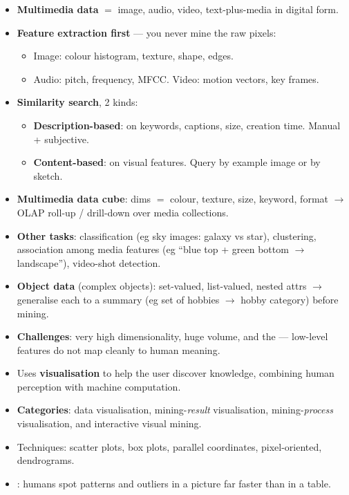 {
{\color{sub}\footnotesize {} }
\begin{itemize}
  \item \textbf{Multimedia data} $=$ image, audio, video, text-plus-media in digital form.
  \item \textbf{Feature extraction first} --- you never mine the raw pixels:
  \begin{itemize}
    \item Image: colour histogram, texture, shape, edges.
    \item Audio: pitch, frequency, MFCC. \quad Video: motion vectors, key frames.
  \end{itemize}
  \item \textbf{Similarity search}, 2 kinds:
  \begin{itemize}
    \item \textbf{Description-based}: on keywords, captions, size, creation time. Manual + subjective.
    \item \textbf{Content-based}: on visual features. Query by example image or by sketch.
  \end{itemize}
  \item \textbf{Multimedia data cube}: dims $=$ colour, texture, size, keyword, format
        $\rightarrow$ OLAP roll-up / drill-down over media collections.
  \item \textbf{Other tasks}: classification (eg sky images: galaxy vs star),
        clustering, association among media features (eg ``blue top + green bottom $\rightarrow$ landscape''),
        video-shot detection.
  \item \textbf{Object data} (complex objects): set-valued, list-valued, nested attrs
        $\rightarrow$ generalise each to a summary (eg set of hobbies $\rightarrow$ hobby category) before mining.
  \item \textbf{Challenges}: very high dimensionality, huge volume, and the
         --- low-level features do not map cleanly to human meaning.
\end{itemize}
\begin{itemize}
  \item Uses \textbf{visualisation} to help the user discover knowledge, combining human perception
        with machine computation.
  \item \textbf{Categories}: data visualisation, mining-\emph{result} visualisation,
        mining-\emph{process} visualisation, and interactive visual mining.
  \item Techniques: scatter plots, box plots, parallel coordinates, pixel-oriented, dendrograms.
  \item {}: humans spot patterns and outliers in a picture far faster than in a table.
\end{itemize}}

